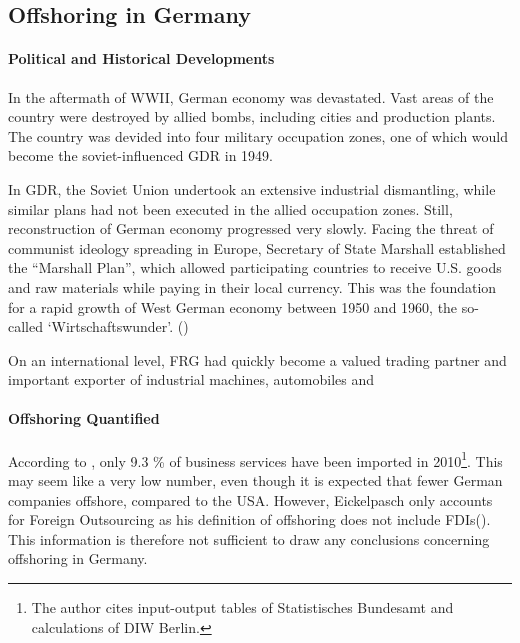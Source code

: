 


\subsection{Offshoring in Germany}
\label{sec:OffshoringGER}

\paragraph{Political and Historical Developments}
In the aftermath of \ac{WWII}, German economy was devastated. Vast areas of the country were destroyed by allied bombs, including cities and production plants. The country was devided into four military occupation zones, one of which would become the soviet-influenced \ac{GDR} in 1949.

In \ac{GDR}, the Soviet Union undertook an extensive industrial dismantling, while similar plans had not been executed in the allied occupation zones. Still, reconstruction of German economy progressed very slowly. Facing the threat of communist ideology spreading in Europe, Secretary of State Marshall established the ``Marshall Plan'', which allowed participating countries to receive U.S. goods and raw materials while paying in their local currency. This was the foundation for a rapid growth of West German economy between 1950 and 1960, the so-called `Wirtschaftswunder'. (\cite{Kimmel.2005})

On an international level, \ac{FRG} had quickly become a valued trading partner and important exporter of industrial machines, automobiles and %


\paragraph{Offshoring Quantified}
According to \cite[p. 70]{Eickelpasch.2015}, only 9.3 \% of business services have been imported in 2010\footnote{The author cites input-output tables of  Statistisches Bundesamt and calculations of DIW Berlin.}. This may seem like a very low number, even though it is expected that fewer German companies offshore, compared to the USA. However, Eickelpasch only accounts for Foreign Outsourcing as his definition of offshoring does not include \acp{FDI}(\cite[p. 56]{Eickelpasch.2015}). This information is therefore not sufficient to draw any conclusions concerning offshoring in Germany.

